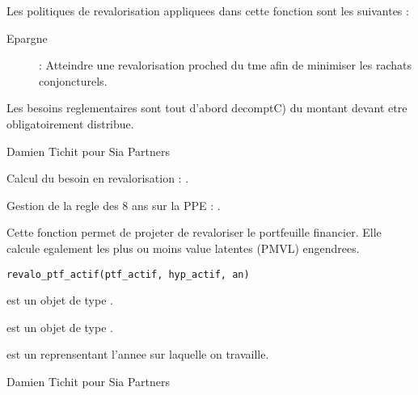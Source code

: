 \documentclass[a4paper]{book}
\begin{document}
%
\begin{Details}\relax
Les politiques de revalorisation appliquees dans cette fonction sont les suivantes :
\begin{description}

\item[Epargne]  : Atteindre une revalorisation proched du tme afin de minimiser les rachats conjoncturels.

\end{description}

Les besoins reglementaires sont tout d'abord decomptC) du montant devant etre obligatoirement distribue.
\end{Details}
%
\begin{Author}\relax
Damien Tichit pour Sia Partners
\end{Author}
%
\begin{SeeAlso}\relax
Calcul du besoin en revalorisation : .

Gestion de la regle des 8 ans sur la PPE : .
\end{SeeAlso}
%
\begin{Description}\relax
Cette fonction permet de projeter de revaloriser le portfeuille financier.
Elle calcule egalement les plus ou moins value latentes (PMVL) engendrees.
\end{Description}
%
\begin{Usage}
\begin{verbatim}
revalo_ptf_actif(ptf_actif, hyp_actif, an)
\end{verbatim}
\end{Usage}
%
\begin{Arguments}
\begin{ldescription}
\item[\code{ptf\_actif}] est un objet de type .

\item[\code{hyp\_actif}] est un objet de type .

\item[\code{an}] est un  reprensentant l'annee sur laquelle on travaille.
\end{ldescription}
\end{Arguments}
%
\begin{Author}\relax
Damien Tichit pour Sia Partners
\end{Author}
\end{document}
